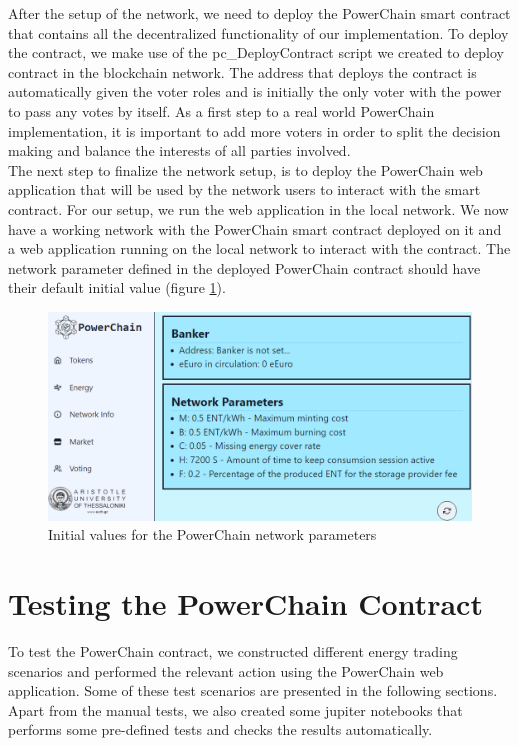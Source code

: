 After the setup of the network, we need to deploy the PowerChain smart contract that contains all the decentralized functionality of our implementation.
To deploy the contract, we make use of the pc\_DeployContract script we created to deploy contract in the blockchain network. The address that deploys the contract
is automatically given the voter roles and is initially the only voter with the power to pass any votes by itself. As a first step to a real world PowerChain implementation,
it is important to add more voters in order to split the decision making and balance the interests of all parties involved. \\
The next step to finalize the network setup, is to deploy the PowerChain web application that will be used by the network users to interact with the smart contract. 
For our setup, we run the web application in the local network. We now have a working network with the PowerChain smart contract deployed on it and a web application running on
the local network to interact with the contract. The network parameter defined in the deployed PowerChain contract should have their default initial value (figure \ref{fig:initial_network_state}).
\begin{figure}[h!]
    \centering
    \includegraphics[width=\linewidth,frame,scale=1]{Figures/initial_network_state.png}
    \caption{Initial values for the PowerChain network parameters}
    \label{fig:initial_network_state}
\end{figure}


\section{Testing the PowerChain Contract}
To test the PowerChain contract, we constructed different energy trading scenarios and performed the relevant action using the PowerChain web application.
Some of these test scenarios are presented in the following sections. Apart from the manual tests, we also created some jupiter notebooks that performs
some pre-defined tests and checks the results automatically.

